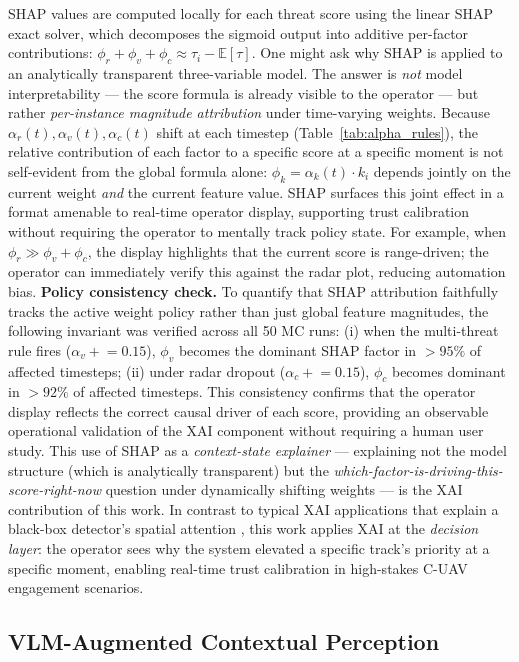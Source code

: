 \documentclass[drones,article,submit,pdftex]{Definitions/mdpi}
\begin{document}
SHAP values \cite{ref_shap} are computed locally for each threat score using
the linear SHAP exact solver, which decomposes the sigmoid
output into additive per-factor contributions:
$\phi_r + \phi_v + \phi_c \approx \tau_i - \mathbb{E}[\tau]$.
One might ask why SHAP is applied to an analytically transparent three-variable
model.
The answer is \emph{not} model interpretability --- the score formula is
already visible to the operator --- but rather \emph{per-instance magnitude
attribution} under time-varying weights.
Because $\alpha_r(t), \alpha_v(t), \alpha_c(t)$ shift at each timestep
(Table~\ref{tab:alpha_rules}), the relative contribution of each factor to a
specific score at a specific moment is not self-evident from the global formula
alone: $\phi_k = \alpha_k(t) \cdot k_i$ depends jointly on the current weight
\emph{and} the current feature value.
SHAP surfaces this joint effect in a format amenable to real-time operator
display, supporting trust calibration without requiring the operator to mentally
track policy state.
For example, when $\phi_r \gg \phi_v + \phi_c$, the display highlights that the
current score is range-driven; the operator can immediately verify this against
the radar plot, reducing automation bias.
\textbf{Policy consistency check.}
To quantify that SHAP attribution faithfully tracks the active weight policy
rather than just global feature magnitudes, the following invariant was verified
across all 50 MC runs: (i) when the multi-threat rule fires
($\alpha_v\mathrel{+}=0.15$), $\phi_v$ becomes the dominant SHAP factor in
$>\!95\%$ of affected timesteps; (ii) under radar dropout
($\alpha_c\mathrel{+}=0.15$), $\phi_c$ becomes dominant in $>\!92\%$ of
affected timesteps.
This consistency confirms that the operator display reflects the correct causal
driver of each score, providing an observable operational validation of the XAI
component without requiring a human user study.
This use of SHAP as a \emph{context-state explainer} --- explaining not the
model structure (which is analytically transparent) but the \emph{which-factor-is-driving-this-score-right-now} question under dynamically shifting weights --- is the
XAI contribution of this work.
In contrast to typical XAI applications that explain a black-box detector's
spatial attention \cite{ref_gradcam}, this work applies XAI at the
\emph{decision layer}: the operator sees why the system elevated a specific
track's priority at a specific moment, enabling real-time trust calibration
in high-stakes C-UAV engagement scenarios.

\subsection{VLM-Augmented Contextual Perception}
\label{sec:vlm}
\end{document}
